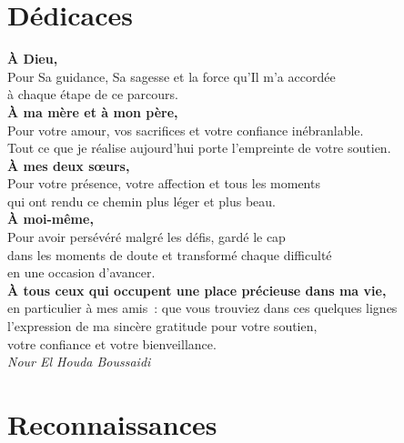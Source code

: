 \documentclass[12pt,a4paper,oneside]{report}
\begin{document}
\cleardoublepage

\chapter*{Dédicaces}

\vspace*{2cm}
\begin{center}
\textbf{À Dieu,}\\[0.4em]
Pour Sa guidance, Sa sagesse et la force qu'Il m'a accordée\\
à chaque étape de ce parcours.\\[1.2em]

\textbf{À ma mère et à mon père,}\\[0.4em]
Pour votre amour, vos sacrifices et votre confiance inébranlable.\\
Tout ce que je réalise aujourd'hui porte l'empreinte de votre soutien.\\[1.2em]

\textbf{À mes deux sœurs,}\\[0.4em]
Pour votre présence, votre affection et tous les moments\\
qui ont rendu ce chemin plus léger et plus beau.\\[1.2em]

\textbf{À moi-même,}\\[0.4em]
Pour avoir persévéré malgré les défis, gardé le cap\\
dans les moments de doute et transformé chaque difficulté\\
en une occasion d'avancer.\\[1.2em]

\textbf{À tous ceux qui occupent une place précieuse dans ma vie,}\\[0.4em]
en particulier à mes amis~: que vous trouviez dans ces quelques lignes\\
l'expression de ma sincère gratitude pour votre soutien,\\
votre confiance et votre bienveillance.\\[2em]

\textit{Nour El Houda Boussaidi}

\end{center}

\cleardoublepage

\chapter*{Reconnaissances}
\end{document}
